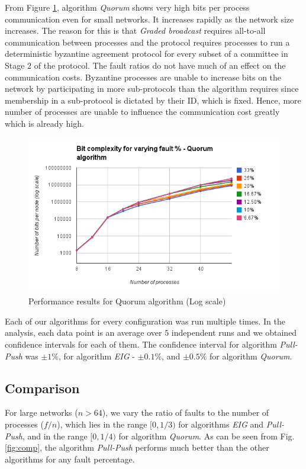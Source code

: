 From Figure \ref{fig:quorum}, algorithm \textit{Quorum} shows very high bits per process communication even for small networks. It increases rapidly as the network size increases. The reason for this is that \textit{Graded broadcast} requires all-to-all communication between processes and the protocol requires processes to run a deterministic byzantine agreement protocol for every subset of a committee in Stage $2$ of the protocol. The fault ratios do not have much of an effect on the communication costs. Byzantine processes are unable to increase bits on the network by participating in more sub-protocols than the algorithm requires since membership in a sub-protocol is dictated by their ID, which is fixed. Hence, more number of processes are unable to influence the communication cost greatly which is already high.  
\begin{figure}[ht]
 \centering
\includegraphics[scale=0.4]{quorum}
\caption{Performance results for Quorum algorithm (Log scale)}
 \label{fig:quorum}
\vspace{-2mm}
\end{figure}

Each of our algorithms for every configuration was run multiple times. In the analysis, each data point is an average over $5$ independent runs and we obtained confidence intervals for each of them. The confidence interval for algorithm \textit{Pull-Push} was $\pm 1\%$, for algorithm \textit{EIG} - $\pm 0.1\%$, and $\pm 0.5\%$ for algorithm \textit{Quorum}.

\subsection{Comparison}
For large networks ($n > 64$), we vary the ratio of faults to the number of processes ($f/n$), which lies in the range $[0, 1/3)$ for algorithms \textit{EIG} and \textit{Pull-Push}, and in the range $[0, 1/4)$ for algorithm \textit{Quorum}.
        As can be seen from Fig. \ref{fig:comp}, the algorithm \textit{Pull-Push} performs much better than the other algorithms for any fault percentage.

